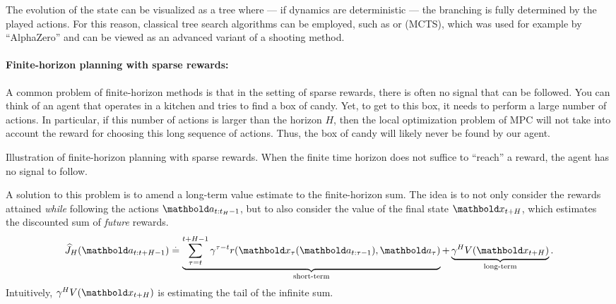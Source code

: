 The evolution of the state can be visualized as a tree where --- if dynamics are deterministic --- the branching is fully determined by the played actions.
For this reason, classical tree search algorithms can be employed, such as  or  (MCTS), which was used for example by ``AlphaZero'' \citep{silver2016mastering,silver2017mastering} and can be viewed as an advanced variant of a shooting method.

\paragraph{Finite-horizon planning with sparse rewards:}

A common problem of finite-horizon methods is that in the setting of sparse rewards, there is often no signal that can be followed.
You can think of an agent that operates in a kitchen and tries to find a box of candy.
Yet, to get to this box, it needs to perform a large number of actions.
In particular, if this number of actions is larger than the horizon $H$, then the local optimization problem of MPC will not take into account the reward for choosing this long sequence of actions.
Thus, the box of candy will likely never be found by our agent.

\begin{marginfigure}
  \caption{Illustration of finite-horizon planning with sparse rewards.
  When the finite time horizon does not suffice to ``reach'' a reward, the agent has no signal to follow.}
\end{marginfigure}

A solution to this problem is to amend a long-term value estimate to the finite-horizon sum.
The idea is to not only consider the rewards attained \emph{while} following the actions $\va_{t:t_H-1}$, but to also consider the value of the final state $\vx_{t+H}$, which estimates the discounted sum of \emph{future} rewards.
\begin{align}
  \J{\va_{t:t+H-1}}[H] \defeq \underbrace{\sum_{\tau=t}^{t+H-1} \gamma^{\tau-t} r(\vx_\tau(\va_{t:\tau-1}), \va_\tau)}_{\text{short-term}} + \underbrace{\gamma^H \V{\vx_{t+H}}}_{\text{long-term}}.
\end{align}
Intuitively, $\gamma^H \V{\vx_{t+H}}$ is estimating the tail of the infinite sum.

